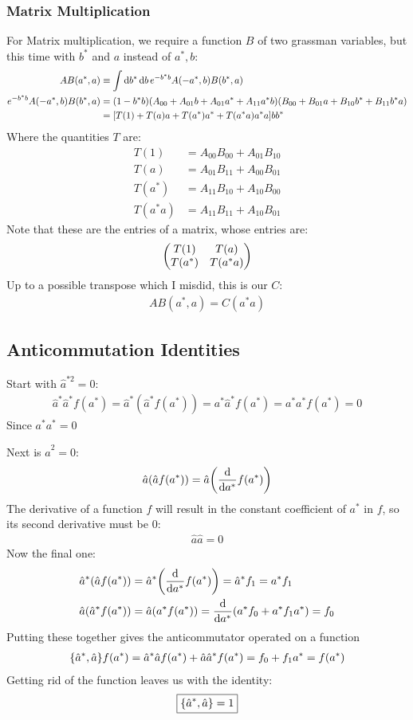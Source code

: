 \documentclass[12pt]{article}
\renewcommand{\a}{\hat{a}}
\begin{document}
\subsubsection{Matrix Multiplication}
For Matrix multiplication, we require a function $B$ of two grassman variables, but this time with $b^*$ and $a$ instead of $a^*,b$:
\begin{align*}
  AB(a^*,a)&\equiv\int\dd{b^*}\dd{b}e^{-b^*b}A(-a^*,b)B(b^*,a)\\
  e^{-b^*b}A(-a^*,b)B(b^*,a)&=(1-b^*b)(A_{00}+A_{01}b+A_{01}a^*+A_{11}a^*b)
  (B_{00}+B_{01}a+B_{10}b^*+B_{11}b^*a)\\
  &=\qty[T(1)+T(a)a+T(a^*)a^*+T(a^*a)a^*a]bb^*
\end{align*}
Where the quantities $T$ are:
\begin{align*}
  T(1)&=A_{00}B_{00}+A_{01}B_{10}\\
  T(a)&=A_{01}B_{11}+A_{00}B_{01}\\
  T(a^*)&=A_{11}B_{10}+A_{10}B_{00}\\
  T(a^*a)&=A_{11}B_{11}+A_{10}B_{01}
\end{align*}
Note that these are the entries of a matrix, whose entries are:
\begin{align*}
  \mqty(T(1)&T(a)\\T(a^*)&T(a^*a))
\end{align*}
Up to a possible transpose which I misdid, this is our $C$:
\begin{align*}
  \boxed{AB(a^*,a)=C(a^*a)}
\end{align*}
\subsection{Anticommutation Identities}
Start with $\hat{a}^{*2}=0$:
\begin{align*}
  \a^*\a^*f(a^*)=\a^*(\a^*f(a^*))=a^*\a^*f(a^*)=a^*a^*f(a^*)=0
\end{align*}
Since $a^*a^*=0$

Next is $\a^2=0$:
\begin{align*}
  \a(\a f(a^*))=\a\qty(\dv{a^*}f(a^*))
\end{align*}
The derivative of a function $f$ will result in the constant coefficient of $a^*$ in $f$, so its second derivative must be $0$:
\begin{align*}
  \a\a = 0
\end{align*}
Now the final one:
\begin{align*}
  \a^*(\a f(a^*))&=\a^*\qty(\dv{a^*}f(a^*))=\a^*f_1=a^*f_1\\
  \a(\a^*f(a^*))&=\a\qty(a^*f(a^*))=\dv{a^*}\qty(a^*f_0+a^*f_1a^*)=f_0
\end{align*}
Putting these together gives the anticommutator operated on a function
\begin{align*}
  \acomm{\a^*}{\a}f(a^*)=\a^*\a f(a^*)+\a\a^*f(a^*)=f_0+f_1a^*=f(a^*)
\end{align*}
Getting rid of the function leaves us with the identity:
\begin{align*}
  \boxed{\acomm{\a^*}{\a}=1}
\end{align*}
\end{document}
